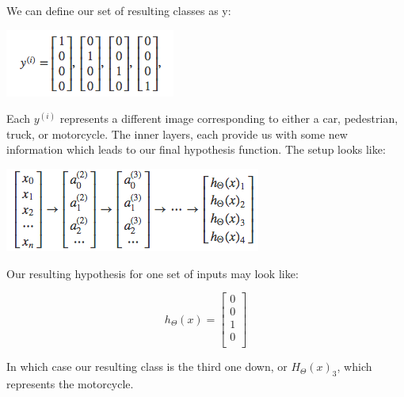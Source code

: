 \documentclass[10pt,a4paper,UTF8]{article}
\begin{document}
We can define our set of resulting classes as y:

\begin{center}
\includegraphics[width=.9\linewidth]{../../img/computer_ng/20171012y.png}
\end{center}

Each \(y^{(i)}\) represents a different image corresponding to either a car, pedestrian, truck, or motorcycle. The inner layers, each provide us with some new information which leads to our final hypothesis function. The setup looks like:

\begin{center}
\includegraphics[width=.9\linewidth]{../../img/computer_ng/20171012setup.png}
\end{center}

Our resulting hypothesis for one set of inputs may look like:

\begin{equation}
\label{eq:12}
h_\Theta(x) =\begin{bmatrix}0 \\ 0 \\ 1 \\ 0 \\\end{bmatrix}
\end{equation}


In which case our resulting class is the third one down, or \(H_{\Theta}(x)_{3}\), which represents the motorcycle.
\end{document}
